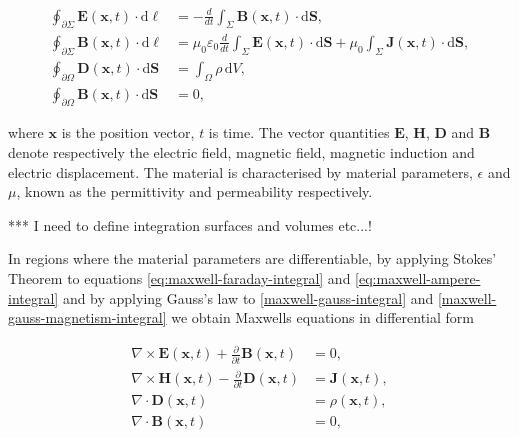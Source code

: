 \begin{subequations}
\begin{align}
    \oint_{\partial \Sigma} \mathbf{E}(\mathbf{x},t) \cdot \mathrm{d}\boldsymbol{\ell}  &= - \frac{d}{dt} \int_{\Sigma} \mathbf{B}(\mathbf{x},t) \cdot \mathrm{d}\mathbf{S}, \label{eq:maxwell-faraday-integral} \\
    \oint_{\partial \Sigma} \mathbf{B}(\mathbf{x},t) \cdot \mathrm{d}\boldsymbol{\ell} &= \mu_0 \varepsilon_0 \frac{d}{dt} \int_{\Sigma} \mathbf{E}(\mathbf{x},t) \cdot \mathrm{d}\mathbf{S} +  \mu_0 \int_{\Sigma} \mathbf{J}(\mathbf{x},t) \cdot \mathrm{d}\mathbf{S}, \label{eq:maxwell-ampere-integral} \\
    \oint_{\partial \Omega} \mathbf{D}(\mathbf{x},t)\cdot\mathrm{d}\mathbf{S} &= \int_\Omega \rho \,\mathrm{d}V, \label{maxwell-gauss-integral} \\
    \oint_{\partial \Omega} \mathbf{B}(\mathbf{x},t)\cdot\mathrm{d}\mathbf{S} &= 0, \label{maxwell-gauss-magnetism-integral}
\end{align}
\end{subequations}


where $\mathbf{x}$ is the position vector, $t$ is time. The vector quantities $\mathbf{E}$, $\mathbf{H}$, $\mathbf{D}$ and $\mathbf{B}$ denote respectively the electric field, magnetic field, magnetic induction and electric displacement. The material is characterised by material parameters, $\epsilon$ and $\mu$, known as the permittivity and permeability respectively.

*** I need to define integration surfaces and volumes etc...!

In regions where the material parameters are differentiable, by applying Stokes' Theorem to equations \ref{eq:maxwell-faraday-integral} and \ref{eq:maxwell-ampere-integral} and by applying Gauss's law to \ref{maxwell-gauss-integral} and \ref{maxwell-gauss-magnetism-integral} we obtain Maxwells equations in differential form


\begin{subequations}
\label{maxwells-equations-diff}
\begin{align}
    \nabla \times \mathbf{E}(\mathbf{x},t) + \frac{\partial }{\partial t} \mathbf{B}(\mathbf{x}, t) &= 0, \label{maxwell-faraday} \\
    \nabla \times \mathbf{H}(\mathbf{x},t) - \frac{\partial }{\partial t} \mathbf{D}(\mathbf{x}, t) &= \mathbf{J}(\mathbf{x},t), \label{maxwell-ampere} \\
    \nabla \cdot \mathbf{D} (\mathbf{x},t) &= \rho(\mathbf{x},t), \label{maxwell-gauss-1} \\
    \nabla \cdot \mathbf{B} (\mathbf{x},t) &= 0, \label{maxwell-gauss-2} \\
\end{align}
\end{subequations}


